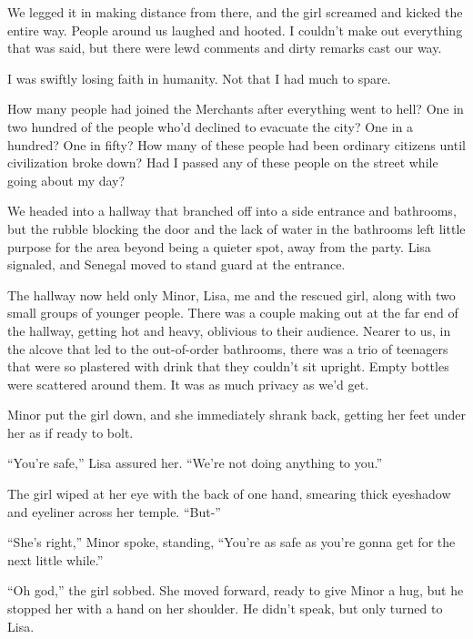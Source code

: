 We legged it in making distance from there, and the girl screamed and kicked the entire way.  People around us laughed and hooted.  I couldn't make out everything that was said, but there were lewd comments and dirty remarks cast our way.



I was swiftly losing faith in humanity.  Not that I had much to spare.



How many people had joined the Merchants after everything went to hell?  One in two hundred of the people who'd declined to evacuate the city?  One in a hundred?  One in fifty?  How many of these people had been ordinary citizens until civilization broke down?  Had I passed any of these people on the street while going about my day?



We headed into a hallway that branched off into a side entrance and bathrooms, but the rubble blocking the door and the lack of water in the bathrooms left little purpose for the area beyond being a quieter spot, away from the party.  Lisa signaled, and Senegal moved to stand guard at the entrance.



The hallway now held only Minor, Lisa, me and the rescued girl, along with two small groups of younger people.  There was a couple making out at the far end of the hallway, getting hot and heavy, oblivious to their audience.  Nearer to us, in the alcove that led to the out-of-order bathrooms, there was a trio of teenagers that were so plastered with drink that they couldn't sit upright.  Empty bottles were scattered around them.  It was as much privacy as we'd get.



Minor put the girl down, and she immediately shrank back, getting her feet under her as if ready to bolt.



``You're safe,'' Lisa assured her.  ``We're not doing anything to you.''



The girl wiped at her eye with the back of one hand, smearing thick eyeshadow and eyeliner across her temple.  ``But-''



``She's right,'' Minor spoke, standing, ``You're as safe as you're gonna get for the next little while.''



``Oh god,'' the girl sobbed.  She moved forward, ready to give Minor a hug, but he stopped her with a hand on her shoulder.  He didn't speak, but only turned to Lisa.



